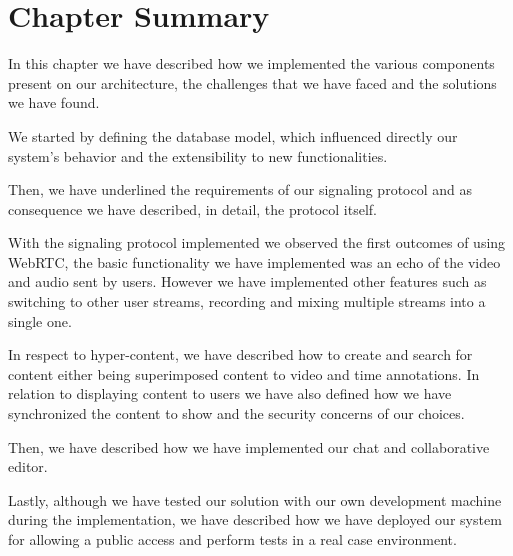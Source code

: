 \section{Chapter Summary}
\label{implementation:summary}

In this chapter we have described how we implemented the various components present on our architecture, the challenges that we have faced and the solutions we have found.

We started by defining the database model, which influenced directly our system's behavior and the extensibility to new functionalities.

Then, we have underlined the requirements of our signaling protocol and as consequence we have described, in detail, the protocol itself.

With the signaling protocol implemented we observed the first outcomes of using \ac{WebRTC}, the basic functionality we have implemented was an echo of the video and audio sent by users. However we have implemented other features such as switching to other user streams, recording and mixing multiple streams into a single one.

In respect to hyper-content, we have described how to create and search for content either being superimposed content to video and time annotations. In relation to displaying content to users we have also defined how we have synchronized the content to show and the security concerns of our choices.

Then, we have described how we have implemented our chat and collaborative editor.

Lastly, although we have tested our solution with our own development machine during the implementation, we have described how we have deployed our system for allowing a public access and perform tests in a real case environment.